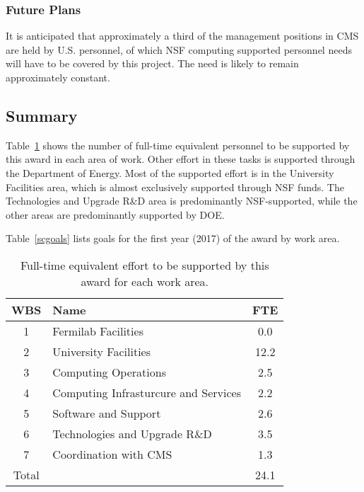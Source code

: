 \documentclass[11pt,a4paper]{article}
\begin{document}
\subsubsection{Future Plans}

It is anticipated that approximately a third of the management positions
in CMS are held by U.S. personnel, of which NSF computing supported 
personnel needs will have to be covered by this project.  The need
is likely to remain approximately constant.

\subsection{Summary}
\label{summary}

Table~\ref{scftecount} shows the number of full-time equivalent
personnel to be supported by this award in each area of work.  Other effort
in these tasks is supported through the Department of Energy.  Most of the
supported effort is in the University Facilities area, which is almost
exclusively supported through NSF funds.  The Technologies and Upgrade R\&D
area is predominantly NSF-supported, while the other areas are
predominantly supported by DOE.

Table~\ref{scgoals} lists goals for the first year (2017) of the award
by work area.  

\begin{table}
\begin{center}
\begin{tabular}{|c|l|c|}
\hline
WBS & Name & FTE \\\hline
1 & Fermilab Facilities & 0.0\\
2 & University Facilities & 12.2\\
3 & Computing Operations & 2.5\\
4 & Computing Infrasturcure and Services & 2.2\\
5 & Software and Support & 2.6\\
6 & Technologies and Upgrade R\&D & 3.5\\
7 & Coordination with CMS & 1.3\\\hline
Total & & 24.1 \\\hline
\end{tabular}
\caption[]
{
Full-time equivalent effort to be supported by this award for each work area.
}
\label{scftecount}
\end{center}
\end{table}
\end{document}
